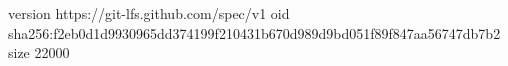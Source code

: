 version https://git-lfs.github.com/spec/v1
oid sha256:f2eb0d1d9930965dd374199f210431b670d989d9bd051f89f847aa56747db7b2
size 22000
